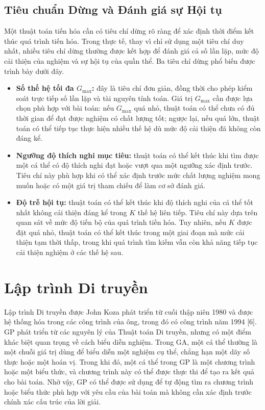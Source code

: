 \subsection*{Tiêu chuẩn Dừng và Đánh giá sự Hội tụ}
\label{subsec:tieu-chuan-dung}

Một thuật toán tiến hóa cần có tiêu chí dừng rõ ràng để xác định thời điểm
kết thúc quá trình tiến hóa. Trong thực tế, thay vì chỉ sử dụng một tiêu chí
duy nhất, nhiều tiêu chí dừng thường được kết hợp để đánh giá cả số lần lặp,
mức độ cải thiện của nghiệm và sự hội tụ của quần thể. Ba tiêu chí dừng phổ
biến được trình bày dưới đây.

\begin{itemize}
    \item \textbf{Số thế hệ tối đa $G_{\max}$:} đây là tiêu chí đơn giản, đồng thời cho phép kiểm soát trực tiếp số lần lặp và tài nguyên tính toán. Giá trị $G_{\max}$ cần được lựa chọn phù hợp với bài toán: nếu $G_{\max}$ quá nhỏ, thuật toán có thể chưa có đủ thời gian để đạt được nghiệm có chất lượng tốt; ngược lại, nếu quá lớn, thuật toán có thể tiếp tục thực hiện nhiều thế hệ dù mức độ cải thiện đã không còn đáng kể.

    \item \textbf{Ngưỡng độ thích nghi mục tiêu:} thuật toán có thể kết thúc khi tìm được một cá thể có độ thích nghi đạt hoặc vượt qua một ngưỡng xác định trước. Tiêu chí này phù hợp khi có thể xác định trước mức chất lượng nghiệm mong muốn hoặc có một giá trị tham chiếu để làm cơ sở đánh giá.

    \item \textbf{Độ trễ hội tụ:} thuật toán có thể kết thúc khi độ thích nghi của cá thể tốt nhất không cải thiện đáng kể trong $K$ thế hệ liên tiếp. Tiêu chí này dựa trên quan sát về mức độ tiến bộ của quá trình tiến hóa. Tuy nhiên, nếu $K$ được đặt quá nhỏ, thuật toán có thể kết thúc trong một giai đoạn mà mức cải thiện tạm thời thấp, trong khi quá trình tìm kiếm vẫn còn khả năng tiếp tục cải thiện nghiệm ở các thế hệ sau.
\end{itemize}


\section{Lập trình Di truyền}
\label{sec:gp}

Lập trình Di truyền được John Koza phát triển từ cuối thập niên 1980
và được hệ thống hóa trong các công trình của ông, trong đó có công
trình năm 1994 [6]. GP phát triển từ các nguyên lý của Thuật toán Di
truyền, nhưng có một điểm khác biệt quan trọng về cách biểu diễn
nghiệm. Trong GA, một cá thể thường là một chuỗi giá trị dùng để biểu
diễn một nghiệm cụ thể, chẳng hạn một dãy số thực hoặc một hoán vị.
Trong khi đó, một cá thể trong GP là một chương trình hoặc một biểu
thức, và chương trình này có thể được thực thi để tạo ra kết quả cho
bài toán. Nhờ vậy, GP có thể được sử dụng để tự động tìm ra chương
trình hoặc biểu thức phù hợp với yêu cầu của bài toán mà không cần
xác định trước chính xác cấu trúc của lời giải.


